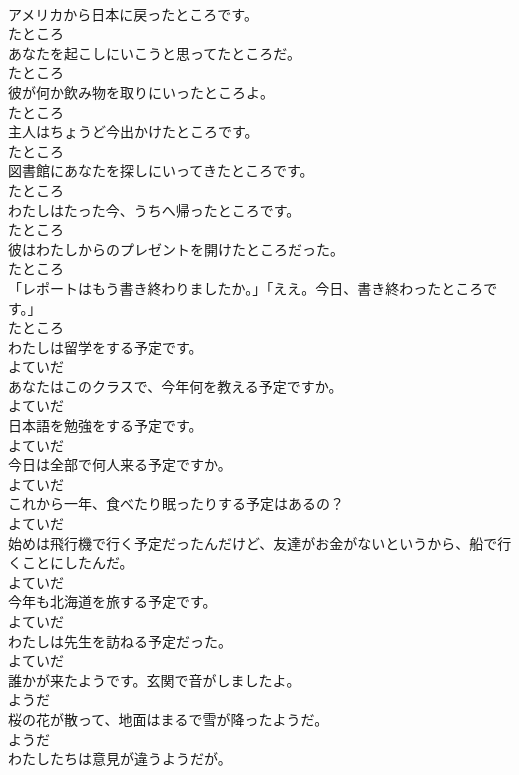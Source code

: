 \documentclass[8pt]{extreport}
\begin{document}
\begin{CJK}{UTF8}{min}
\\	アメリカから日本に戻ったところです。	
\\	たところ
\\	あなたを起こしにいこうと思ってたところだ。	
\\	たところ
\\	彼が何か飲み物を取りにいったところよ。	
\\	たところ
\\	主人はちょうど今出かけたところです。	
\\	たところ
\\	図書館にあなたを探しにいってきたところです。	
\\	たところ
\\	わたしはたった今、うちへ帰ったところです。	
\\	たところ
\\	彼はわたしからのプレゼントを開けたところだった。	
\\	たところ
\\	「レポートはもう書き終わりましたか。」「ええ。今日、書き終わったところです。」	
\\	たところ
\\	わたしは留学をする予定です。	
\\	よていだ
\\	あなたはこのクラスで、今年何を教える予定ですか。	
\\	よていだ
\\	日本語を勉強をする予定です。	
\\	よていだ
\\	今日は全部で何人来る予定ですか。	
\\	よていだ
\\	これから一年、食べたり眠ったりする予定はあるの？	
\\	よていだ
\\	始めは飛行機で行く予定だったんだけど、友達がお金がないというから、船で行くことにしたんだ。	
\\	よていだ
\\	今年も北海道を旅する予定です。	
\\	よていだ
\\	わたしは先生を訪ねる予定だった。	
\\	よていだ
\\	誰かが来たようです。玄関で音がしましたよ。	
\\	ようだ
\\	桜の花が散って、地面はまるで雪が降ったようだ。	
\\	ようだ
\\	わたしたちは意見が違うようだが。	

\end{CJK}
\end{document}
